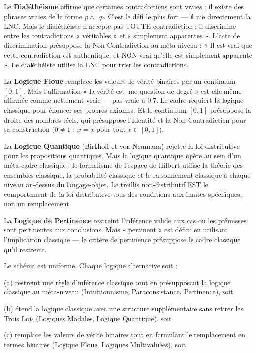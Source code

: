\documentclass[10pt, openany, oneside]{book}
\begin{document}
Le \textbf{Dialéthéisme} affirme que certaines contradictions sont vraies : il existe des phrases vraies de la forme $p \wedge \neg p$. C'est le défi le plus fort --- il nie directement la LNC. Mais le dialéthéiste n'accepte pas TOUTE contradiction ; il discrimine entre les contradictions « véritables » et « simplement apparentes ». L'acte de discrimination présuppose la Non-Contradiction au méta-niveau : « Il est vrai que cette contradiction est authentique, et NON vrai qu'elle est simplement apparente ». Le dialéthéiste utilise la LNC pour trier les contradictions.

La \textbf{Logique Floue} remplace les valeurs de vérité binaires par un continuum $[0, 1]$. Mais l'affirmation « la vérité est une question de degré » est elle-même affirmée comme nettement vraie --- pas vraie à 0.7. Le cadre requiert la logique classique pour énoncer ses propres axiomes. Et le continuum $[0, 1]$ présuppose la droite des nombres réels, qui présuppose l'Identité et la Non-Contradiction pour sa construction ($0 \neq 1$ ; $x = x$ pour tout $x \in [0,1]$).

La \textbf{Logique Quantique} (Birkhoff et von Neumann) rejette la loi distributive pour les propositions quantiques. Mais la logique quantique opère au sein d'un méta-cadre classique : le formalisme de l'espace de Hilbert utilise la théorie des ensembles classique, la probabilité classique et le raisonnement classique à chaque niveau au-dessus du langage-objet. Le treillis non-distributif EST le comportement de la loi distributive sous des conditions aux limites spécifiques, non un remplacement.

La \textbf{Logique de Pertinence} restreint l'inférence valide aux cas où les prémisses sont pertinentes aux conclusions. Mais « pertinent » est défini en utilisant l'implication classique --- le critère de pertinence présuppose le cadre classique qu'il restreint.

Le schéma est uniforme. Chaque logique alternative soit :

(a) restreint une règle d'inférence classique tout en présupposant la logique classique au méta-niveau (Intuitionnisme, Paraconsistance, Pertinence), soit

(b) étend la logique classique avec une structure supplémentaire sans retirer les Trois Lois (Logiques Modales, Logique Quantique), soit

(c) remplace les valeurs de vérité binaires tout en formulant le remplacement en termes binaires (Logique Floue, Logiques Multivaluées), soit
\end{document}

